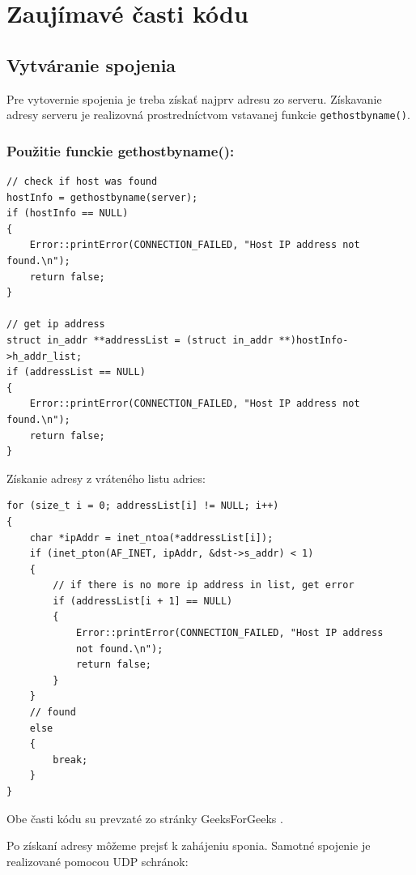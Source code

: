 \section{Zaujímavé časti kódu}
\label{Zaujímavé časti kódu}

\subsection{Vytváranie spojenia}
\label{Vytváranie spojenia}
Pre vytovernie spojenia je treba získať najprv adresu zo serveru. Získavanie adresy serveru je realizovná prostredníctvom vstavanej funkcie 
\verb|gethostbyname()|.


\subsubsection{Použitie funckie gethostbyname():}
\begin{verbatim}
// check if host was found
hostInfo = gethostbyname(server);
if (hostInfo == NULL)
{
    Error::printError(CONNECTION_FAILED, "Host IP address not found.\n");
    return false;
}

// get ip address
struct in_addr **addressList = (struct in_addr **)hostInfo->h_addr_list;
if (addressList == NULL)
{
    Error::printError(CONNECTION_FAILED, "Host IP address not found.\n");
    return false;
}
\end{verbatim}

\newpage
\noindent Získanie adresy z vráteného listu adries:
\begin{verbatim}
for (size_t i = 0; addressList[i] != NULL; i++)
{
    char *ipAddr = inet_ntoa(*addressList[i]);
    if (inet_pton(AF_INET, ipAddr, &dst->s_addr) < 1)
    {
        // if there is no more ip address in list, get error
        if (addressList[i + 1] == NULL)
        {
            Error::printError(CONNECTION_FAILED, "Host IP address 
            not found.\n");
            return false;
        }
    }
    // found
    else
    {
        break;
    }
}
\end{verbatim}

\noindent Obe časti kódu su prevzaté zo stránky GeeksForGeeks \cite{gethostbyname}.

Po získaní adresy môžeme prejsť k zahájeniu sponia. Samotné spojenie je realizované pomocou UDP schránok:

